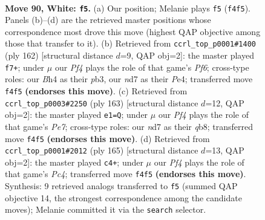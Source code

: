 \documentclass[11pt]{article}
\begin{document}
\clearpage

\begin{figure}[p]\centering
\begin{subfigure}{0.46\textwidth}\centering
\resizebox{\linewidth}{!}{%
\newchessgame
\chessboard[
  setfen={6k1/3n4/8/8/p3KP1B/P6P/8/8 w - - 6 90},
  showmover=false,
  pgfstyle=straightmove, color=movearrow, markmove={f4-f5}
]}
\caption{}
\end{subfigure}\hfill
\begin{subfigure}{0.46\textwidth}\centering
\resizebox{\linewidth}{!}{%
\newchessgame
\chessboard[
  setfen={4k3/8/4KP2/p7/P3P3/1p6/1P6/8 w - - 5 82},
  showmover=false,
  pgfstyle=straightmove, color=movearrow, markmove={f6-f7}
]}
\caption{}
\end{subfigure}
\\[4pt]
\begin{subfigure}{0.46\textwidth}\centering
\resizebox{\linewidth}{!}{%
\newchessgame
\chessboard[
  setfen={1Q6/6p1/6P1/8/8/5k2/K3p3/8 b - - 0 82},
  showmover=false,
  pgfstyle=straightmove, color=movearrow, markmove={e2-e1}
]}
\caption{}
\end{subfigure}\hfill
\begin{subfigure}{0.46\textwidth}\centering
\resizebox{\linewidth}{!}{%
\newchessgame
\chessboard[
  setfen={8/8/5P2/p1pk4/P7/3K4/8/8 b - - 0 83},
  showmover=false,
  pgfstyle=straightmove, color=movearrow, markmove={c5-c4}
]}
\caption{}
\end{subfigure}
\caption{\textbf{Move 90, White: \texttt{f5}.} (a) Our position; Melanie plays \texttt{f5} (\texttt{f4f5}). Panels (b)--(d) are the retrieved master positions whose correspondence most drove this move (highest QAP objective among those that transfer to it). (b) Retrieved from \texttt{ccrl\_top\_p0001\#1400} (ply 162) [structural distance $d$=9, QAP obj=2]: the master played \texttt{f7+}; under $\mu$ our \emph{Pf4} plays the role of that game's \emph{Pf6}; cross-type roles: our \emph{B}h4 as their \emph{p}b3, our \emph{n}d7 as their \emph{P}e4; transferred move \texttt{f4f5} \textbf{(endorses this move)}. (c) Retrieved from \texttt{ccrl\_top\_p0003\#2250} (ply 163) [structural distance $d$=12, QAP obj=2]: the master played \texttt{e1=Q}; under $\mu$ our \emph{Pf4} plays the role of that game's \emph{Pe7}; cross-type roles: our \emph{n}d7 as their \emph{q}b8; transferred move \texttt{f4f5} \textbf{(endorses this move)}. (d) Retrieved from \texttt{ccrl\_top\_p0001\#2012} (ply 165) [structural distance $d$=13, QAP obj=2]: the master played \texttt{c4+}; under $\mu$ our \emph{Pf4} plays the role of that game's \emph{Pc4}; transferred move \texttt{f4f5} \textbf{(endorses this move)}. Synthesis: 9 retrieved analogs transferred to \texttt{f5} (summed QAP objective 14, the strongest correspondence among the candidate moves); Melanie committed it via the \texttt{search} selector.}
\label{fig:thought-m178}
\end{figure}
\end{document}
